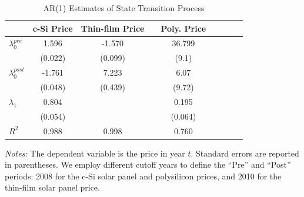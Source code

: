 \documentclass[12pt]{article}
\begin{document}
\begin{table}[tbh]
\centering
\caption{AR(1) Estimates of State Transition Process}
\label{tab:est_state_transition}
\begin{threeparttable}
\begin{tabularx}{0.9\textwidth}{Xcccccccc}
\toprule
& \multicolumn{1}{c}{c-Si Price}  & \multicolumn{1}{c}{Thin-film Price} && \multicolumn{1}{c}{Poly. Price} \\
\midrule
$\lambda_0^{pre}$ 
    & 1.596 & -1.570 && 36.799  \\
    & (0.022) & (0.099) && (9.1)  \\

$\lambda_0^{post}$ 
    & -1.761 & 7.223 &&  6.07 \\
    & (0.048) & (0.439) && (9.72)  \\

$\lambda_1$  
    & 0.804 &  &&  0.195 \\
    & (0.054) &  &&  (0.064)  \\

\midrule
$R^2$ 
    & 0.988 & 0.998 &&  0.760  \\
\bottomrule
\end{tabularx}
\begin{tablenotes}
    \item \textit{Notes:}  The dependent variable is the price in year $t$. Standard errors are reported in parentheses. We employ different cutoff years to define the “Pre” and “Post” periods: 2008 for the c-Si solar panel and polysilicon prices, and 2010 for the thin-film solar panel price.
\end{tablenotes}
\end{threeparttable}
\end{table}


\end{document}
